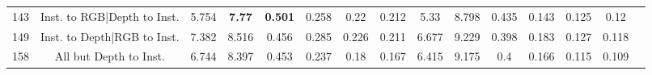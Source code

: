 \begin{table}
\begin{tabular}{@{\hskip3pt}c@{\hskip3pt}c@{\hskip3pt}c@{\hskip3pt}c@{\hskip3pt}c@{\hskip3pt}c@{\hskip3pt}c@{\hskip3pt}c@{\hskip3pt}c@{\hskip3pt}c@{\hskip3pt}c@{\hskip3pt}c@{\hskip3pt}c@{\hskip3pt}c@{\hskip3pt}c}
                                          143 &    Inst. to RGB|Depth to Inst. &             5.754 &  \textbf{7.77} &  \textbf{0.501} &           0.258 &            0.22 &           0.212 &                5.33 &         8.798 &           0.435 &           0.143 &           0.125 &            0.12 \\
                                          149 &    Inst. to Depth|RGB to Inst. &             7.382 &          8.516 &           0.456 &           0.285 &           0.226 &           0.211 &               6.677 &         9.229 &           0.398 &           0.183 &           0.127 &           0.118 \\
                                          158 &         All but Depth to Inst. &             6.744 &          8.397 &           0.453 &           0.237 &            0.18 &           0.167 &               6.415 &         9.175 &             0.4 &           0.166 &           0.115 &           0.109 \\
\bottomrule
\end{tabular}
\end{table}
